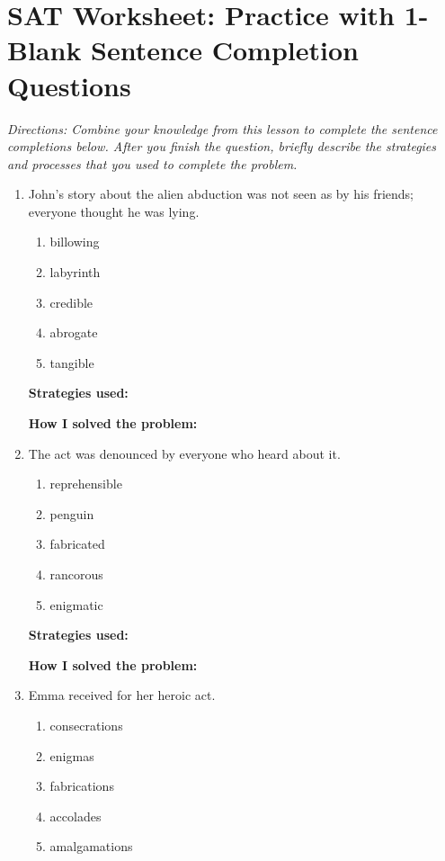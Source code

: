 \section{SAT Worksheet: Practice with 1-Blank Sentence Completion Questions}

\textit{Directions: Combine your knowledge from this lesson to complete the sentence completions below. After you finish the question, briefly describe the strategies and processes that you used to complete the problem.}
\begin{enumerate}

\item John's story about the alien abduction was not seen as by \longline his friends; everyone thought he was lying.

\begin{enumerate}[label=(\Alph*)]
\item billowing  
\item labyrinth 
\item credible
\item abrogate 
\item tangible 
\end{enumerate}

\textbf{\large Strategies used:} \hrulefill

\textbf{\large How I solved the problem:} \hrulefill

\item The \longline act was denounced by everyone who heard about it.

\begin{enumerate}[label=(\Alph*)] 
\item reprehensible
\item penguin  
\item fabricated
\item rancorous 
\item enigmatic   
\end{enumerate}

\textbf{\large Strategies used:} \hrulefill

\textbf{\large How I solved the problem:} \hrulefill

\item Emma received \longline for her heroic act.
 
\begin{enumerate} [label=(\Alph*)]
\item consecrations 
\item enigmas 
\item fabrications 
\item accolades 
\item amalgamations  
\end{enumerate}


\end{enumerate}
